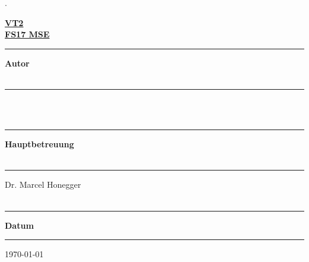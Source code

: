 \begin{titlepage}



\begin{minipage}[b]{0.117\textwidth}
\hskip 0.05cm
\end{minipage}
\begin{minipage}[b]{0.91\textwidth}
\begin{tiny}.\end{tiny}\vskip 2.8cm
	{\huge

	\textbf{\underline{VT2}}\\
	\textbf{\underline{FS17 MSE}}\\

	\myTitle
	\vskip 0.5cm}

	\begin{minipage}[b]{0.27\textwidth}
	\hrule\vskip 0.5cm
		\textbf{Autor}\\
		\\
	\end{minipage}
	\begin{minipage}[b]{0.03\textwidth}
	\hskip 0.5cm
	\end{minipage}
	\begin{minipage}[b]{0.7\textwidth}
	\hrule\vskip 0.5cm
		\myAuthorName \\
		\\
	\end{minipage}

	\begin{minipage}[b]{0.27\textwidth}
	\hrule\vskip 0.5cm
		\textbf{Hauptbetreuung}\\
		\\
	\end{minipage}
	\begin{minipage}[b]{0.03\textwidth}
	\hskip 0.5cm
	\end{minipage}
	\begin{minipage}[b]{0.7\textwidth}
	\hrule\vskip 0.5cm
		Dr. Marcel Honegger\\
		\\
	\end{minipage}



	\begin{minipage}[b]{0.27\textwidth}
	\hrule\vskip 0.5cm
		\textbf{Datum}
	\end{minipage}
	\begin{minipage}[b]{0.03\textwidth}
	\hskip 0.5cm
	\end{minipage}
	\begin{minipage}[b]{0.7\textwidth}
	\hrule\vskip 0.5cm
		\today
	\end{minipage}
\end{minipage}
\vskip 0.5cm




\end{titlepage}
